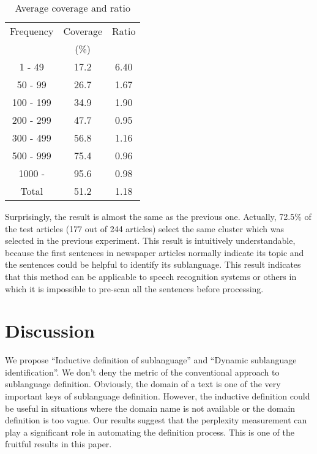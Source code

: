 \begin{table}[hbt]
\begin{center}
\begin{tabular}{|c||c|c|}
\hline
Frequency &   Coverage &  Ratio   \\
          &   (\%)     &          \\
\hline
1 - 49    &     17.2   &  6.40  \\
50 - 99   &     26.7   &  1.67  \\
100 - 199 &     34.9   &  1.90  \\
200 - 299 &     47.7   &  0.95  \\
300 - 499 &     56.8   &  1.16  \\
500 - 999 &     75.4   &  0.96  \\
1000 -    &     95.6   &  0.98  \\
\hline
Total     &     51.2   &  1.18  \\
\hline
\end{tabular}
\caption{\label{T4} Average coverage and ratio}
\end{center}
\end{table}

Surprisingly, the result is almost the same as the previous one.
Actually, 72.5\% of the test articles (177 out of 244 articles) select the same cluster
which was selected in the previous experiment.
This result is intuitively understandable, 
because the first sentences in newspaper articles normally indicate its topic and
the sentences could be helpful to identify its sublanguage.
This result indicates that this method can be applicable to
speech recognition systems or others in which it is impossible to pre-scan all the
sentences before processing.

\section{Discussion}

We propose ``Inductive definition of sublanguage'' and
``Dynamic sublanguage identification''.
We don't deny the metric of the conventional approach to sublanguage definition.
Obviously, the domain of a text is one of the very important keys
of sublanguage definition.
However, the inductive definition could be useful in situations
where the domain name is not available or the domain definition is too vague.
Our results suggest that the perplexity measurement can play a significant role
in automating the definition process.
This is one of the fruitful results in this paper.

